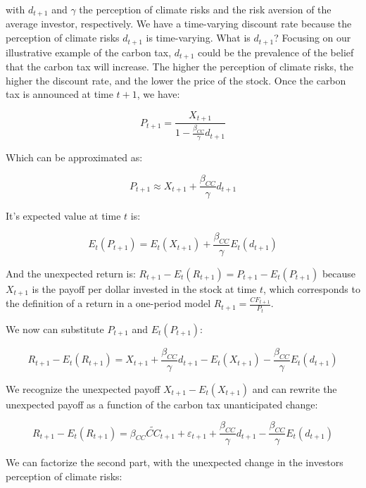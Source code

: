 with $d_{t+1}$ and $\gamma$ the perception of climate 
risks and the risk aversion of the average investor, respectively.
We have a time-varying discount rate because
the perception of climate risks $d_{t+1}$ is time-varying.
What is $d_{t+1}$? Focusing on our illustrative 
example of the carbon tax, $d_{t+1}$ could be the
prevalence of the belief that the carbon tax will increase.
The higher the perception of climate risks, the higher
the discount rate, and the lower the price of the stock.
Once the carbon tax is announced at time $t+1$, we have:

\begin{equation}
    P_{t+1} = \frac{X_{t+1}}{1 - \frac{\beta_{CC}}{\gamma}d_{t+1}}
\end{equation}

Which can be approximated as:

\begin{equation}
    P_{t+1} \approx X_{t+1} + \frac{\beta_{CC}}{\gamma}d_{t+1}
\end{equation}

It's expected value at time $t$ is:

\begin{equation}
    E_t(P_{t+1}) = E_t(X_{t+1}) + \frac{\beta_{CC}}{\gamma}E_t(d_{t+1})
\end{equation}

And the unexpected return is:
$
    R_{t+1} - E_t(R_{t+1}) = P_{t+1} - E_t(P_{t+1})
$
because $X_{t+1}$ is the payoff per dollar invested in the stock at time $t$,
which corresponds to the definition of a return in a 
one-period model $R_{t+1} = \frac{CF_{t+1}}{P_t}$.

We now can substitute $P_{t+1}$ and $E_t(P_{t+1})$:

\begin{equation}
    R_{t+1} - E_t(R_{t+1}) = X_{t+1} + \frac{\beta_{CC}}{\gamma}d_{t+1} - E_t(X_{t+1}) - \frac{\beta_{CC}}{\gamma}E_t(d_{t+1})
\end{equation}

We recognize the unexpected payoff $X_{t+1} - E_t(X_{t+1})$
and can rewrite the unexpected payoff as a function of the carbon tax
unanticipated change:

\begin{equation}
    R_{t+1} - E_t(R_{t+1}) = \beta_{CC} \tilde{CC}_{t+1} + \varepsilon_{t+1} + \frac{\beta_{CC}}{\gamma}d_{t+1} - \frac{\beta_{CC}}{\gamma}E_t(d_{t+1})
\end{equation}

We can factorize the second part, with
the unexpected change in the investors perception of climate risks:


